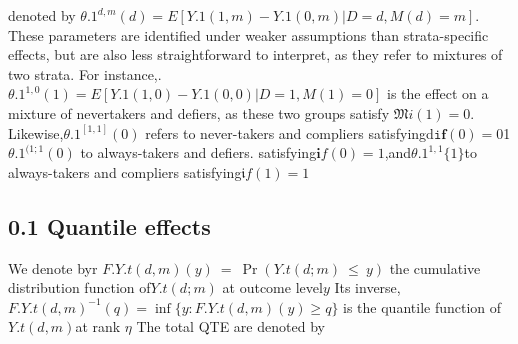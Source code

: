 \documentclass{article}
\begin{document}
denoted by $\theta . { 1 } ^ { d, m } ( d ) = E [ Y . { 1 } ( 1, m ) - Y . { 1 } ( 0, m ) | D = d, M ( d ) = m ]$. These parameters
are identified under weaker assumptions than strata-specific effects, but are also less
straightforward to interpret, as they refer to mixtures of two strata. For instance,.
$\theta . { 1 } ^ { 1, 0 } ( 1 ) = E [ Y . { 1 } ( 1, 0 ) - Y . { 1 } ( 0, 0 ) | D = 1, M ( 1 ) = 0 ]$ is the effect on a mixture of nevertakers and defiers, as these two groups satisfy $\mathfrak { M } i ( 1 ) = 0$. Likewise,$\theta . { 1 } ^ { [ 1, 1 ] } ( 0 )$ refers to
never-takers and compliers satisfyingd$\mathtt { i } \mathbf { f } ( 0 ) = 0$1$\theta . { 1 } ^ { ( 1 ; 1 } ( 0 )$ to always-takers and defiers.
satisfying$\mathbf { i } f ( 0 ) = 1$,and$\theta . { 1 } ^ { 1, 1 } \{ 1 \}$to always-takers and compliers satisfying$\mathfrak { i } f ( 1 ) = 1$


\subsection*{0.1 Quantile effects}


We denote byr $F . { Y . { t } ( d, m ) } ( y ) ~ = ~ \operatorname* { P r } ( Y . { t } ( d ; m ) ~ \leq ~ y )$ the cumulative distribution function
of$Y . { t } ( d ; m )$ at outcome level$y$ Its inverse, $F . { Y . { t } ( d, m ) } ^ { - 1 } ( q ) = \operatorname* { i n f } \{ y : F . { Y . { t } ( d, m ) } ( y ) \geq q \}$ is
the quantile function of$Y . { t } ( d, m )$at rank $\eta$ The total QTE are denoted by
\end{document}
